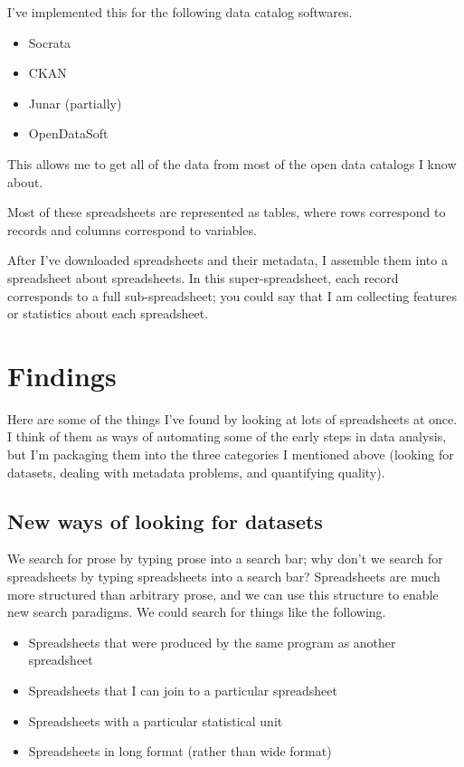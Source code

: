 \documentclass{acm_proc_article-sp}
\begin{document}
I've implemented this for the following data catalog softwares.

\begin{itemize}
\item Socrata
\item CKAN
\item Junar (partially)
\item OpenDataSoft
\end{itemize}

This allows me to get all of the data from most of the open data catalogs I know about.

Most of these spreadsheets are represented as tables,
where rows correspond to records and columns correspond to variables. \cite{table}

After I've downloaded spreadsheets and their metadata,
I assemble them into a spreadsheet about spreadsheets. \cite{data-driven}
In this super-spreadsheet, each record corresponds to a full
sub-spreadsheet; you could say that I am collecting features or statistics
about each spreadsheet.

\section{Findings}
Here are some of the things I've found by looking at lots of spreadsheets at
once. I think of them as ways of automating some of the early steps in data
analysis, but I'm packaging them into the three categories I mentioned above
(looking for datasets, dealing with metadata problems, and quantifying quality).

\subsection{New ways of looking for datasets}
We search for prose by typing prose into a search bar; why don't
we search for spreadsheets by typing spreadsheets into a search bar?
Spreadsheets are much more structured than arbitrary prose, and we
can use this structure to enable new search paradigms. We could search
for things like the following.

\begin{itemize}
\item Spreadsheets that were produced by the same program as another spreadsheet
\item Spreadsheets that I can join to a particular spreadsheet
\item Spreadsheets with a particular statistical unit
\item Spreadsheets in long format (rather than wide format)
\end{itemize}
\end{document}
